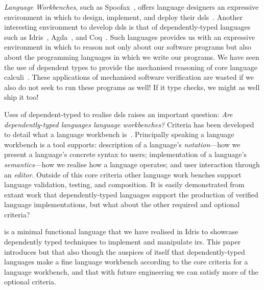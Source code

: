 \emph{Language Workbenches}, such as Spoofax~\cite{DBLP:journals/software/WachsmuthKV14}, offers language designers an expressive environment in which to design, implement, and deploy their \Acp{dsl}~\cite{hudak1996building}.
Another interesting environment to develop \acp{dsl} is that of dependently-typed languages such as Idris~\cite{DBLP:conf/ecoop/Brady21}, Agda~\cite{DBLP:conf/afp/Norell08}, and Coq~\cite{the_coq_development_team_2022_5846982}.
Such languages provides us with an expressive environment in which to reason not only about our software programs but also about the programming languages in which we write our programs.
We have seen the use of dependent types to provide the mechanised reasoning of core language calculi~\cite{10.1145/3093333.3009866,DBLP:conf/cpp/RouvoetPKV20,DBLP:conf/mpc/ChapmanKNW19}.
These applications of mechanised software verification are wasted if we also do not seek to run these programs as well!
If it type checks, we might as well ship it too!

Uses of dependent-typed to realise \acp{dsl} raises an important question:
\emph{Are dependently-typed languages language workbenches?}
Criteria has been developed to detail what a language workbench is~\cite{DBLP:conf/sle/ErdwegSVBBCGHKLKMPPSSSVVVWW13}.
Principally speaking a language workbench is a tool supports:
description of a language's \emph{notation}---how we present a language's concrete syntax to users;
implementation of a language's \emph{semantics}---how we realise how a language operates;
and
user interaction through an \emph{editor}.
Outside of this core criteria other language work benches support language validation, testing, and composition.
It is easily demonstrated from extant work that dependently-typed languages support the production of verified language implementations, but what about the other required and optional criteria?


\Velo{} is a minimal functional language that we have realised in Idris to showcase dependently typed techniques to implement and manipulate \acp{ir}.
This paper introduces \Velo{} but that also though the auspices of \Velo{} itself that dependently-typed languages make a fine language workbench according to the core criteria for a language workbench, and that with future engineering we can satisfy more of the optional criteria.



